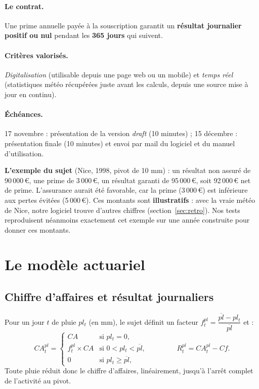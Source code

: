 \documentclass[11pt,a4paper]{article}
\newcommand{\eur}[1]{#1\,€}
\newcommand{\plbar}{\overline{pl}}
\begin{document}
\paragraph{Le contrat.} Une prime annuelle payée à la souscription garantit un \textbf{résultat journalier positif ou nul}
pendant les \textbf{365 jours} qui suivent.

\paragraph{Critères valorisés.} \emph{Digitalisation} (utilisable depuis une page web ou un mobile) et \emph{temps réel}
(statistiques météo récupérées juste avant les calculs, depuis une source mise à jour en continu).

\paragraph{Échéances.} 17 novembre : présentation de la version \emph{draft} (10 minutes) ;
15 décembre : présentation finale (10 minutes) et envoi par mail du logiciel et du manuel d'utilisation.

\begin{encadre}
\textbf{L'exemple du sujet} (Nice, 1998, pivot de 10 mm) : un résultat non assuré de \eur{90\,000}, une prime de
\eur{3\,000}, un résultat garanti de \eur{95\,000}, soit \eur{92\,000} net de prime. L'assurance aurait été favorable,
car la prime (\eur{3\,000}) est inférieure aux pertes évitées (\eur{5\,000}). Ces montants sont \textbf{illustratifs} :
avec la vraie météo de Nice, notre logiciel trouve d'autres chiffres (section~\ref{sec:retro}). Nos tests reproduisent
néanmoins exactement cet exemple sur une année construite pour donner ces montants.
\end{encadre}

\section{Le modèle actuariel}

\subsection{Chiffre d'affaires et résultat journaliers}
Pour un jour $t$ de pluie $pl_t$ (en mm), le sujet définit un facteur $f_t^{pl} = \dfrac{\plbar - pl_t}{\plbar}$ et :
\[
CA_t^{pl} =
\begin{cases}
CA & \text{si } pl_t = 0,\\[2pt]
f_t^{pl}\times CA & \text{si } 0 < pl_t < \plbar,\\[2pt]
0 & \text{si } pl_t \ge \plbar,
\end{cases}
\qquad\qquad R_t^{pl} = CA_t^{pl} - Cf.
\]
Toute pluie réduit donc le chiffre d'affaires, linéairement, jusqu'à l'arrêt complet de l'activité au pivot.
\end{document}
